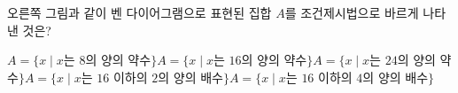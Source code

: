 \noindent\begin{minipage}[t]{0.58\linewidth}\vspace{0pt}\raggedright 오른쪽 그림과 같이 벤 다이어그램으로 표현된 집합 $A$를 조건제시법으로 바르게 나타낸 것은?\end{minipage}\hfill\begin{minipage}[t]{0.4\linewidth}\vspace{0pt}\centering \resizebox{\ifdim\width>\linewidth\linewidth\else\width\fi}{!}{}\end{minipage}\par
\begin{choicesv}{$A=\{x \mid x$는 $8$의 양의 약수$\}$}{$A=\{x \mid x$는 $16$의 양의 약수$\}$}{$A=\{x \mid x$는 $24$의 양의 약수$\}$}{$A=\{x \mid x$는 $16$ 이하의 $2$의 양의 배수$\}$}{$A=\{x \mid x$는 $16$ 이하의 $4$의 양의 배수$\}$}\end{choicesv}

